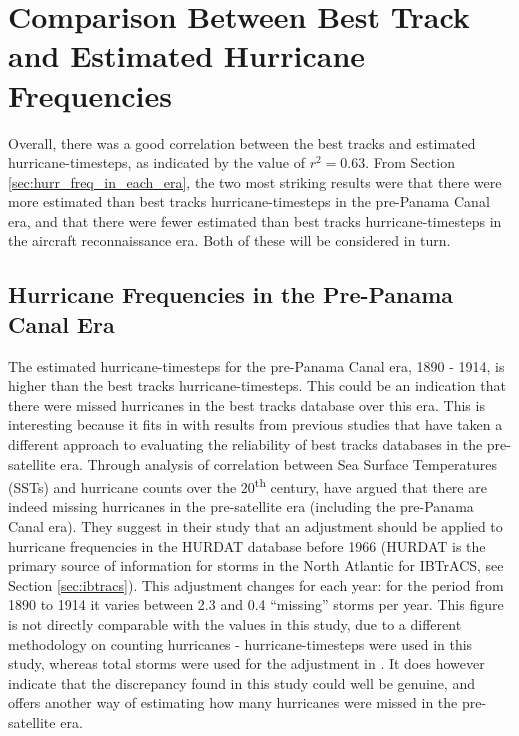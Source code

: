 \documentclass[pdftex,12pt,a4paper]{report}
\newcommand{\ts}{\textsuperscript}
\begin{document}
\section{Comparison Between Best Track and Estimated Hurricane Frequencies}
\label{sec:freq_comparison}

Overall, there was a good correlation between the best tracks and estimated hurricane-timesteps, as
indicated by the value of $r^2 = 0.63$. From Section \ref{sec:hurr_freq_in_each_era}, the two most
striking results were that there were more estimated than best tracks hurricane-timesteps in the
pre-Panama Canal era, and that there were fewer estimated than best tracks hurricane-timesteps in
the aircraft reconnaissance era. Both of these will be considered in turn.

\subsection{Hurricane Frequencies in the Pre-Panama Canal Era}
The estimated hurricane-timesteps for the pre-Panama Canal era, 1890 - 1914, is higher than the best
tracks hurricane-timesteps. This could be an indication that there were missed hurricanes in the
best tracks database over this era. This is interesting because it fits in with results from previous
studies that have taken a different approach to evaluating the reliability of best tracks databases
in the pre-satellite era. Through analysis of correlation between Sea Surface Temperatures (SSTs)
and hurricane counts over the 20\ts{th} century, \textcite{vecchi2008estimates} have argued that
there are indeed missing hurricanes in the pre-satellite era (including the pre-Panama Canal era).
They suggest in their study that an adjustment should be applied to hurricane frequencies in
the HURDAT database before 1966 (HURDAT is the primary source of information for storms in the North
Atlantic for IBTrACS, see Section \ref{sec:ibtracs}). This adjustment changes for each year: for
the period from 1890 to 1914 it varies between 2.3 and 0.4 ``missing'' storms per year. This figure
is not directly comparable with the values in this study, due to a different methodology on counting
hurricanes - hurricane-timesteps were used in this study, whereas total storms were used for the
adjustment in \textcite{vecchi2008estimates}. It does however indicate that the discrepancy found in
this study could well be genuine, and offers another way of estimating how many hurricanes were
missed in the pre-satellite era.
\end{document}
